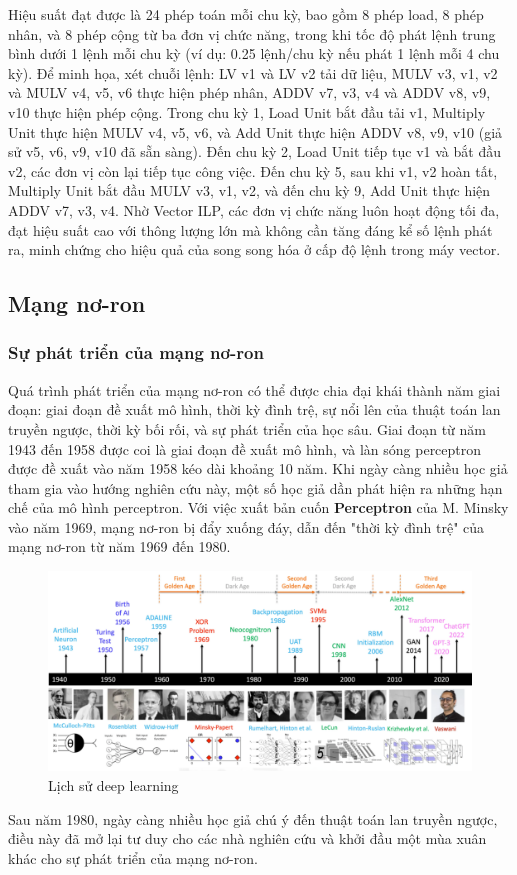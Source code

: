 \documentclass[a4paper]{article}
\begin{document}
Hiệu suất đạt được là 24 phép toán mỗi chu kỳ, bao gồm 8 phép load, 8 phép nhân, và 8 phép cộng từ ba đơn vị chức năng, trong khi tốc độ phát lệnh trung bình dưới 1 lệnh mỗi chu kỳ (ví dụ: 0.25 lệnh/chu kỳ nếu phát 1 lệnh mỗi 4 chu kỳ). Để minh họa, xét chuỗi lệnh: LV v1 và LV v2 tải dữ liệu, MULV v3, v1, v2 và MULV v4, v5, v6 thực hiện phép nhân, ADDV v7, v3, v4 và ADDV v8, v9, v10 thực hiện phép cộng. Trong chu kỳ 1, Load Unit bắt đầu tải v1, Multiply Unit thực hiện MULV v4, v5, v6, và Add Unit thực hiện ADDV v8, v9, v10 (giả sử v5, v6, v9, v10 đã sẵn sàng). Đến chu kỳ 2, Load Unit tiếp tục v1 và bắt đầu v2, các đơn vị còn lại tiếp tục công việc. Đến chu kỳ 5, sau khi v1, v2 hoàn tất, Multiply Unit bắt đầu MULV v3, v1, v2, và đến chu kỳ 9, Add Unit thực hiện ADDV v7, v3, v4. Nhờ Vector ILP, các đơn vị chức năng luôn hoạt động tối đa, đạt hiệu suất cao với thông lượng lớn mà không cần tăng đáng kể số lệnh phát ra, minh chứng cho hiệu quả của song song hóa ở cấp độ lệnh trong máy vector.

\subsection{Mạng nơ-ron}
\subsubsection{Sự phát triển của mạng nơ-ron}
Quá trình phát triển của mạng nơ-ron có thể được chia đại khái thành năm giai đoạn: giai đoạn đề xuất mô hình, thời kỳ đình trệ, sự nổi lên của thuật toán lan truyền ngược, thời kỳ bối rối, và sự phát triển của học sâu.
Giai đoạn từ năm 1943 đến 1958 được coi là giai đoạn đề xuất mô hình, và làn sóng perceptron được đề xuất vào năm 1958 kéo dài khoảng 10 năm. Khi ngày càng nhiều học giả tham gia vào hướng nghiên cứu này, một số học giả dần phát hiện ra những hạn chế của mô hình perceptron. Với việc xuất bản cuốn \textbf{Perceptron} của M. Minsky vào năm 1969, mạng nơ-ron bị đẩy xuống đáy, dẫn đến "thời kỳ đình trệ" của mạng nơ-ron từ năm 1969 đến 1980.
\begin{figure}[H]
    \centering
    \includegraphics[width=1\linewidth]{assets/dl-history.png}
    \caption{Lịch sử deep learning}
    \label{fig:enter-label}
\end{figure}
Sau năm 1980, ngày càng nhiều học giả chú ý đến thuật toán lan truyền ngược, điều này đã mở lại tư duy cho các nhà nghiên cứu và khởi đầu một mùa xuân khác cho sự phát triển của mạng nơ-ron.
\end{document}
